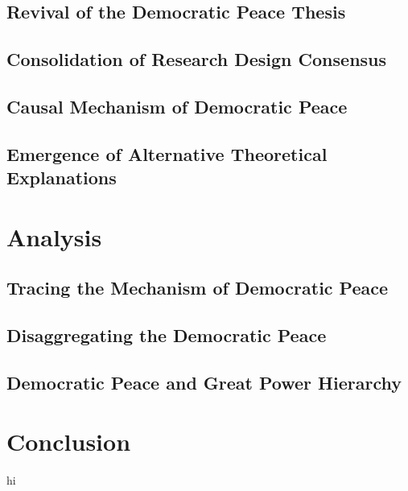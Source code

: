 \documentclass{beamer}
\begin{document}
	\subsection{Revival of the Democratic Peace Thesis}
	
	\subsection{Consolidation of Research Design Consensus}
	
	\subsection{Causal Mechanism of Democratic Peace}
	
	\subsection{Emergence of Alternative Theoretical Explanations}

	\section{Analysis}
	
	\subsection{Tracing the Mechanism of Democratic Peace}
	
	\subsection{Disaggregating the Democratic Peace}
	
	\subsection{Democratic Peace and Great Power Hierarchy}
	
	\section{Conclusion}
	
	hi
	
\end{document}
